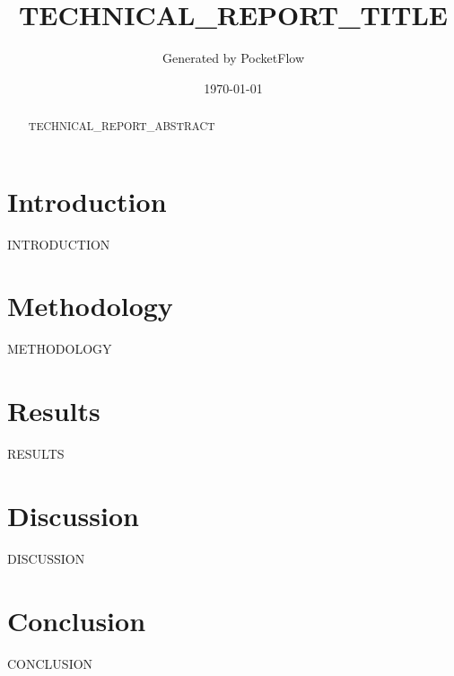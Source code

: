 \documentclass[11pt,a4paper]{article}
\begin{document}
\title{TECHNICAL_REPORT_TITLE}
\author{Generated by PocketFlow}
\date{\today}

\maketitle

\begin{abstract}
TECHNICAL_REPORT_ABSTRACT
\end{abstract}

\tableofcontents
\newpage

\section{Introduction}
INTRODUCTION

\section{Methodology}
METHODOLOGY

\section{Results}
RESULTS

\section{Discussion}
DISCUSSION

\section{Conclusion}
CONCLUSION
\end{document}
